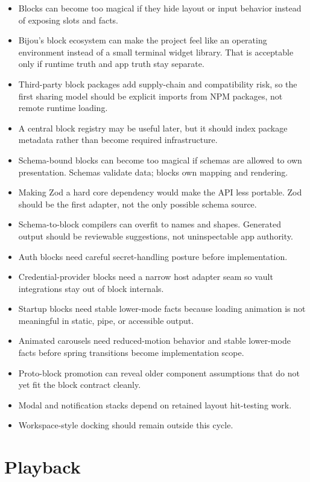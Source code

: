 \begin{itemize}
\tightlist
\item
  Blocks can become too magical if they hide layout or input behavior instead of exposing slots and facts.
\item
  Bijou's block ecosystem can make the project feel like an operating environment instead of a small terminal widget library. That is acceptable only if runtime truth and app truth stay separate.
\item
  Third-party block packages add supply-chain and compatibility risk, so the first sharing model should be explicit imports from NPM packages, not remote runtime loading.
\item
  A central block registry may be useful later, but it should index package metadata rather than become required infrastructure.
\item
  Schema-bound blocks can become too magical if schemas are allowed to own presentation. Schemas validate data; blocks own mapping and rendering.
\item
  Making Zod a hard core dependency would make the API less portable. Zod should be the first adapter, not the only possible schema source.
\item
  Schema-to-block compilers can overfit to names and shapes. Generated output should be reviewable suggestions, not uninspectable app authority.
\item
  Auth blocks need careful secret-handling posture before implementation.
\item
  Credential-provider blocks need a narrow host adapter seam so vault integrations stay out of block internals.
\item
  Startup blocks need stable lower-mode facts because loading animation is not meaningful in static, pipe, or accessible output.
\item
  Animated carousels need reduced-motion behavior and stable lower-mode facts before spring transitions become implementation scope.
\item
  Proto-block promotion can reveal older component assumptions that do not yet fit the block contract cleanly.
\item
  Modal and notification stacks depend on retained layout hit-testing work.
\item
  Workspace-style docking should remain outside this cycle.
\end{itemize}

\section{Playback}\label{record-128-playback}

